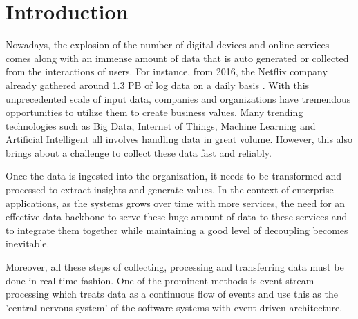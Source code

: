 \chapter{Introduction} \label{chap:intro}
Nowadays, the explosion of the number of digital devices and online services comes along with an immense amount of data that is auto generated or collected from the interactions of users. For instance, from 2016, the Netflix company already gathered around 1.3 PB of log data on a daily basis \cite{netflixpipeline}. With this unprecedented scale of input data, companies and organizations have tremendous opportunities to utilize them to create business values. Many trending technologies such as Big Data, Internet of Things, Machine Learning and Artificial Intelligent all involves handling data in great volume. However, this also brings about a challenge to collect these data fast and reliably.


Once the data is ingested into the organization, it needs to be transformed  and processed to extract insights and generate values. In the context of enterprise applications, as the systems grows over time with more services, the need for an effective data backbone to serve these huge amount of data to these services and to integrate them together while maintaining a good level of decoupling becomes inevitable.

Moreover, all these steps of collecting, processing and transferring data must be done in real-time fashion. One of the prominent methods is event stream processing which treats data as a continuous flow of events and use this as the 'central nervous system' of the software systems with event-driven architecture.

